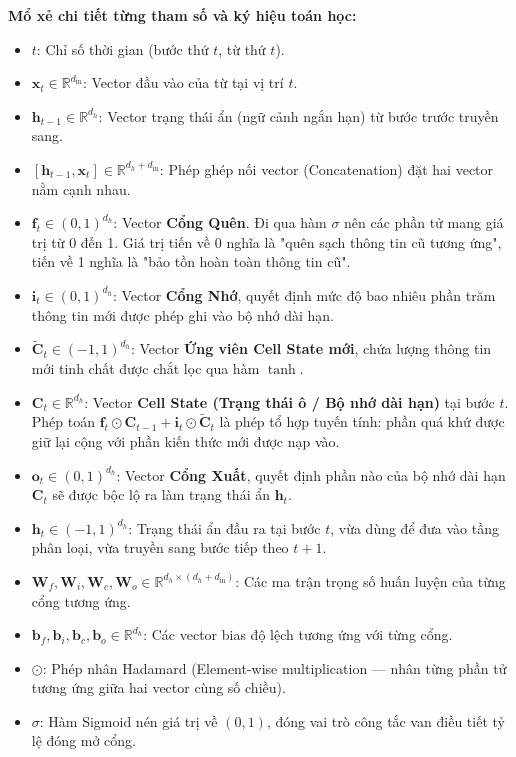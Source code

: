 \documentclass[10pt,a4paper]{article}
\begin{document}
\textbf{Mổ xẻ chi tiết từng tham số và ký hiệu toán học:}
\begin{itemize}[leftmargin=*]
    \item $t$: Chỉ số thời gian (bước thứ $t$, từ thứ $t$).
    \item $\mathbf{x}_t \in \mathbb{R}^{d_{\text{in}}}$: Vector đầu vào của từ tại vị trí $t$.
    \item $\mathbf{h}_{t-1} \in \mathbb{R}^{d_h}$: Vector trạng thái ẩn (ngữ cảnh ngắn hạn) từ bước trước truyền sang.
    \item $[\mathbf{h}_{t-1}, \mathbf{x}_t] \in \mathbb{R}^{d_h + d_{\text{in}}}$: Phép ghép nối vector (Concatenation) đặt hai vector nằm cạnh nhau.
    \item $\mathbf{f}_t \in (0, 1)^{d_h}$: Vector \textbf{Cổng Quên}. Đi qua hàm $\sigma$ nên các phần tử mang giá trị từ 0 đến 1. Giá trị tiến về 0 nghĩa là "quên sạch thông tin cũ tương ứng", tiến về 1 nghĩa là "bảo tồn hoàn toàn thông tin cũ".
    \item $\mathbf{i}_t \in (0, 1)^{d_h}$: Vector \textbf{Cổng Nhớ}, quyết định mức độ bao nhiêu phần trăm thông tin mới được phép ghi vào bộ nhớ dài hạn.
    \item $\tilde{\mathbf{C}}_t \in (-1, 1)^{d_h}$: Vector \textbf{Ứng viên Cell State mới}, chứa lượng thông tin mới tinh chất được chắt lọc qua hàm $\tanh$.
    \item $\mathbf{C}_t \in \mathbb{R}^{d_h}$: Vector \textbf{Cell State (Trạng thái ô / Bộ nhớ dài hạn)} tại bước $t$. Phép toán $\mathbf{f}_t \odot \mathbf{C}_{t-1} + \mathbf{i}_t \odot \tilde{\mathbf{C}}_t$ là phép tổ hợp tuyến tính: phần quá khứ được giữ lại cộng với phần kiến thức mới được nạp vào.
    \item $\mathbf{o}_t \in (0, 1)^{d_h}$: Vector \textbf{Cổng Xuất}, quyết định phần nào của bộ nhớ dài hạn $\mathbf{C}_t$ sẽ được bộc lộ ra làm trạng thái ẩn $\mathbf{h}_t$.
    \item $\mathbf{h}_t \in (-1, 1)^{d_h}$: Trạng thái ẩn đầu ra tại bước $t$, vừa dùng để đưa vào tầng phân loại, vừa truyền sang bước tiếp theo $t+1$.
    \item $\mathbf{W}_f, \mathbf{W}_i, \mathbf{W}_c, \mathbf{W}_o \in \mathbb{R}^{d_h \times (d_h + d_{\text{in}})}$: Các ma trận trọng số huấn luyện của từng cổng tương ứng.
    \item $\mathbf{b}_f, \mathbf{b}_i, \mathbf{b}_c, \mathbf{b}_o \in \mathbb{R}^{d_h}$: Các vector bias độ lệch tương ứng với từng cổng.
    \item $\odot$: Phép nhân Hadamard (Element-wise multiplication --- nhân từng phần tử tương ứng giữa hai vector cùng số chiều).
    \item $\sigma$: Hàm Sigmoid nén giá trị về $(0, 1)$, đóng vai trò công tắc van điều tiết tỷ lệ đóng mở cổng.
\end{itemize}
\end{document}
